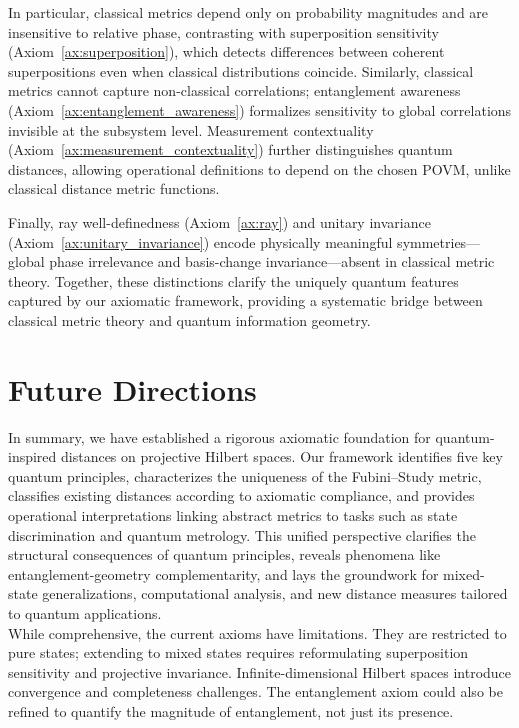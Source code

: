 \documentclass[aps,pra,reprint,nofootinbib,showpacs,superscriptaddress]{revtex4-1}
\begin{document}
In particular, classical metrics depend only on probability magnitudes and are insensitive to relative phase, contrasting with superposition sensitivity (Axiom~\ref{ax:superposition}), which detects differences between coherent superpositions even when classical distributions coincide. Similarly, classical metrics cannot capture non-classical correlations; entanglement awareness (Axiom~\ref{ax:entanglement_awareness}) formalizes sensitivity to global correlations invisible at the subsystem level. Measurement contextuality (Axiom~\ref{ax:measurement_contextuality}) further distinguishes quantum distances, allowing operational definitions to depend on the chosen POVM, unlike classical distance metric functions.

Finally, ray well-definedness (Axiom~\ref{ax:ray}) and unitary invariance (Axiom~\ref{ax:unitary_invariance}) encode physically meaningful symmetries—global phase irrelevance and basis-change invariance—absent in classical metric theory. Together, these distinctions clarify the uniquely quantum features captured by our axiomatic framework, providing a systematic bridge between classical metric theory and quantum information geometry.


\section{Future Directions}\label{sec:open}
\noindent In summary, we have established a rigorous axiomatic foundation for quantum-inspired distances on projective Hilbert spaces. Our framework identifies five key quantum principles, characterizes the uniqueness of the Fubini--Study metric, classifies existing distances according to axiomatic compliance, and provides operational interpretations linking abstract metrics to tasks such as state discrimination and quantum metrology. This unified perspective clarifies the structural consequences of quantum principles, reveals phenomena like entanglement-geometry complementarity, and lays the groundwork for mixed-state generalizations, computational analysis, and new distance measures tailored to quantum applications.\\

\noindent  While comprehensive, the current axioms have limitations. They are restricted to pure states; extending to mixed states requires reformulating superposition sensitivity and projective invariance. Infinite-dimensional Hilbert spaces introduce convergence and completeness challenges. The entanglement axiom could also be refined to quantify the magnitude of entanglement, not just its presence.
\end{document}
